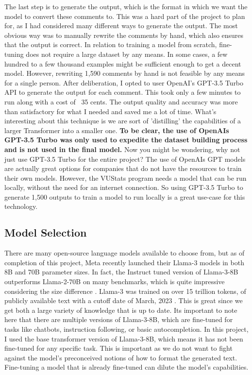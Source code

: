 \documentclass[12pt]{article}
\begin{document}
The last step is to generate the output, which is the format in which we want the model to convert these comments to. This was a hard part of the project to plan for, as I had considered many different ways to generate the output. The most obvious way was to manually rewrite the comments by hand, which also ensures that the output is correct. In relation to training a model from scratch, fine-tuning does not require a large dataset by any means. In some cases, a few hundred to a few thousand examples might be sufficient enough to get a decent model. However, rewriting 1,590 comments by hand is not feasible by any means for a single person. After deliberation, I opted to user OpenAI's GPT-3.5 Turbo API to generate the output for each comment. This took only a few minutes to run along with a cost of ~35 cents. The output quality and accuracy was more than satisfactory for what I needed and saved me a lot of time. What's interesting about this technique is we are sort of 'distilling' the capabilities of a larger Transformer into a smaller one. \textbf{To be clear, the use of OpenAIs GPT-3.5 Turbo was only used to expedite the dataset building process and is not used in the final model.} Now you might be wondering, why not just use GPT-3.5 Turbo for the entire project? The use of OpenAIs GPT models are actually great options for companies that do not have the resources to train their own models. However, the VUStats program needs a model that can be run locally, without the need for an internet connection. So using GPT-3.5 Turbo to generate 1,500 outputs to train a model to run locally is a great use-case for this technology.

\subsection{Model Selection}
There are many open-source language models available to choose from, but as of completion of this project, Meta recently launched their Llama-3 models in both 8B and 70B parameter sizes. In fact, the Instruct tuned version of Llama-3-8B outperforms Llama-2-70B on many benchmarks, which is quite impressive considering the size difference \cite{llama3}. Llama-3 was trained on over 15 trillion tokens, of publicly available text with a cutoff date of March, 2023 \cite{llama3}. This is great since we get both a large variety of knowledge that is up to date. Its important to note here that there are multiple versions of Llama-3-8B, which are fine-tuned for tasks like chatbots, instruction following, or basic autocompletion. In this project, I used the base transformer version of Llama-3-8B, which means it has not been fine-tuned for any specific task. This is important as we do not want to fight against the model's preconceived notions of how to format the generated text. Fine-tuning a model that is already fine-tuned can dilute the model's capabilities. 
\end{document}
